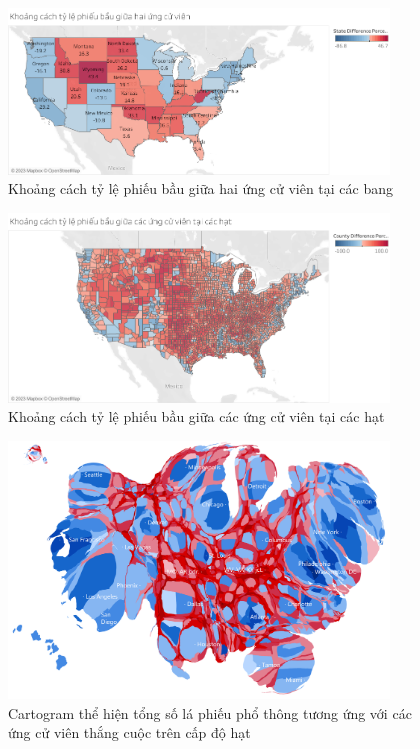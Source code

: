 \documentclass[14pt, a4paper]{article}
\numberwithin{equation}{section}
\numberwithin{figure}{section}
\numberwithin{dl}{section}
\numberwithin{md}{section}
\numberwithin{bd}{section}
\numberwithin{dn}{section}
\numberwithin{hq}{section}
\begin{document}
    \begin{figure}[h!]
        \centering
        \includegraphics[width=0.9\textwidth]{figures/State_Difference_Percentage_Total_Vote_Two_Candidate.png}
        \caption{Khoảng cách tỷ lệ phiếu bầu giữa hai ứng cử viên tại các bang}
    \end{figure}

    \begin{figure}[h!]
        \centering
        \includegraphics[width=0.9\textwidth]{figures/County_Difference_Percentage_Total_Vote_Two_Candidate.png}
        \caption{Khoảng cách tỷ lệ phiếu bầu giữa các ứng cử viên tại các hạt}
    \end{figure}

    \begin{figure}[h!]
        \centering
        \includegraphics[width=0.9\textwidth]{figures/County_Total_Vote_Cartogram.png}
        \caption{Cartogram thể hiện tổng số lá phiếu phổ thông tương ứng với các ứng cử viên thắng cuộc trên cấp độ hạt}
    \end{figure}
\end{document}

